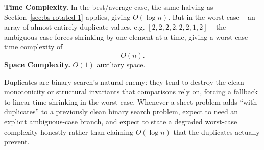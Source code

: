\begin{complexitybox}
\textbf{Time Complexity.} In the best/average case, the same halving as
Section~\ref{sec:bs-rotated-1} applies, giving $O(\log n)$. But in the
worst case -- an array of almost entirely duplicate values, e.g.
$[2,2,2,2,2,2,1,2]$ -- the ambiguous case forces shrinking by one element
at a time, giving a worst-case time complexity of
\[
  O(n).
\]
\textbf{Space Complexity.} $O(1)$ auxiliary space.
\end{complexitybox}

\begin{takeawaybox}
Duplicates are binary search's natural enemy: they tend to destroy the
clean monotonicity or structural invariants that comparisons rely on,
forcing a fallback to linear-time shrinking in the worst case. Whenever a
sheet problem adds ``with duplicates'' to a previously clean binary search
problem, expect to need an explicit ambiguous-case branch, and expect to
state a degraded worst-case complexity honestly rather than claiming
$O(\log n)$ that the duplicates actually prevent.
\end{takeawaybox}
